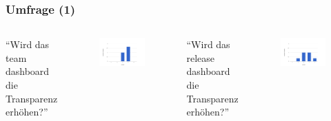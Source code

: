 \documentclass{beamer}
\begin{document}
\begin{frame}
\frametitle{Umfrage (1)}
\begin{columns}
   ``Wird das team dashboard die Transparenz erh\"ohen?''
   \begin{figure}[h!]
    \centering
    \includegraphics[scale=0.3,keepaspectratio=true]{./halo2a.png}
   \end{figure}
   ``Wird das release dashboard die Transparenz erh\"ohen?''
   \begin{figure}[h!]
    \centering
    \includegraphics[scale=0.3,keepaspectratio=true]{./halo2d.png}
   \end{figure}
\end{columns}
\end{frame}
\end{document}
